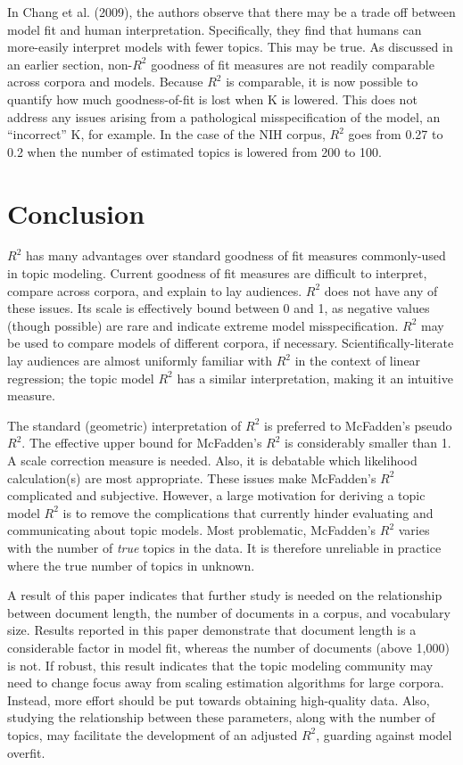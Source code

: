 \documentclass[conference,final,]{IEEEtran}
\begin{document}
In Chang et al. (2009), the authors observe that there may be a trade
off between model fit and human interpretation. Specifically, they find
that humans can more-easily interpret models with fewer topics. This may
be true. As discussed in an earlier section, non-\(R^2\) goodness of fit
measures are not readily comparable across corpora and models. Because
\(R^2\) is comparable, it is now possible to quantify how much
goodness-of-fit is lost when K is lowered. This does not address any
issues arising from a pathological misspecification of the model, an
``incorrect'' K, for example. In the case of the NIH corpus, \(R^2\)
goes from 0.27 to 0.2 when the number of estimated topics is lowered
from 200 to 100.

\hypertarget{conclusion}{%
\section{Conclusion}\label{conclusion}}

\(R^2\) has many advantages over standard goodness of fit measures
commonly-used in topic modeling. Current goodness of fit measures are
difficult to interpret, compare across corpora, and explain to lay
audiences. \(R^2\) does not have any of these issues. Its scale is
effectively bound between 0 and 1, as negative values (though possible)
are rare and indicate extreme model misspecification. \(R^2\) may be
used to compare models of different corpora, if necessary.
Scientifically-literate lay audiences are almost uniformly familiar with
\(R^2\) in the context of linear regression; the topic model \(R^2\) has
a similar interpretation, making it an intuitive measure.

The standard (geometric) interpretation of \(R^2\) is preferred to
McFadden's pseudo \(R^2\). The effective upper bound for McFadden's
\(R^2\) is considerably smaller than 1. A scale correction measure is
needed. Also, it is debatable which likelihood calculation(s) are most
appropriate. These issues make McFadden's \(R^2\) complicated and
subjective. However, a large motivation for deriving a topic model
\(R^2\) is to remove the complications that currently hinder evaluating
and communicating about topic models. Most problematic, McFadden's
\(R^2\) varies with the number of \textit{true} topics in the data. It
is therefore unreliable in practice where the true number of topics in
unknown.

A result of this paper indicates that further study is needed on the
relationship between document length, the number of documents in a
corpus, and vocabulary size. Results reported in this paper demonstrate
that document length is a considerable factor in model fit, whereas the
number of documents (above 1,000) is not. If robust, this result
indicates that the topic modeling community may need to change focus
away from scaling estimation algorithms for large corpora. Instead, more
effort should be put towards obtaining high-quality data. Also, studying
the relationship between these parameters, along with the number of
topics, may facilitate the development of an adjusted \(R^2\), guarding
against model overfit.
\end{document}
